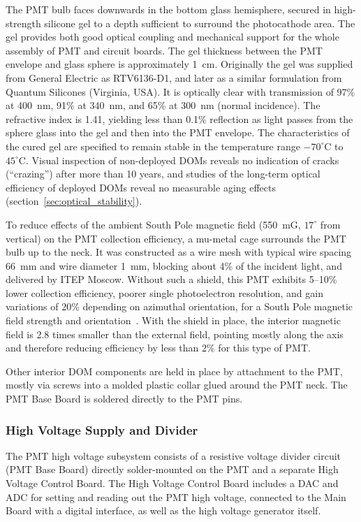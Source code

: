 The PMT bulb faces downwards in the bottom glass hemisphere, secured in high-strength 
silicone gel to a depth sufficient to surround the photocathode area.  
The gel provides both good optical coupling and mechanical support for the
whole assembly of PMT and circuit boards. The gel thickness between the PMT
envelope and glass sphere is approximately \qty{1}{cm}.   
Originally the gel was supplied from General Electric as RTV6136-D1,
and later as a similar formulation from Quantum Silicones (Virginia, USA).  
It is optically clear with transmission of 97\% at \qty{400}{nm}, 91\% at \qty{340}{nm}, and 65\% at \qty{300}{nm}
(normal incidence).  The refractive index is 1.41, yielding less than 0.1\% reflection as light
passes from the sphere glass into the gel and then into the PMT envelope.
The characteristics of the cured gel are specified to remain stable in the
temperature range $-70^\circ$C to $45^\circ$C.  Visual inspection of
non-deployed DOMs reveals no indication of cracks (``crazing'') after more than 10
years, and studies of the long-term optical efficiency of deployed DOMs
reveal no measurable aging effects (section~\ref{sec:optical_stability}).  

To reduce effects of the ambient South Pole magnetic field (\qty{550}{mG}, $17^\circ$
from vertical) on the PMT collection efficiency, a mu-metal cage surrounds the PMT bulb up to
the neck.  It was constructed as a wire mesh with typical wire spacing \qty{66}{mm} and
wire diameter \qty{1}{mm}, blocking about 4\% of the incident light,
and delivered by ITEP Moscow.
Without such a shield, this PMT exhibits 5--10\% lower
collection efficiency, poorer single photoelectron resolution, and gain variations of 20\% depending on 
azimuthal orientation, for a South Pole magnetic field strength and orientation~\cite{calvo}.
With the shield in place, the interior magnetic field is 2.8 times
smaller than the external field, pointing mostly along the axis and therefore reducing efficiency by
less than 2\% for this type of PMT.

Other interior DOM components are held in place by attachment to the PMT, mostly via screws into
a molded plastic collar glued around the PMT neck.  The PMT Base Board is
soldered directly to the PMT pins.

\subsubsection{\label{sec:hv}High Voltage Supply and Divider}

The PMT high voltage subsystem consists of a resistive 
voltage divider circuit (PMT Base Board) directly
solder-mounted on the PMT and a separate High Voltage Control Board. 
The High Voltage Control Board includes a DAC and ADC for setting and reading out the PMT high voltage,
connected to the Main Board with a digital interface, as well as the high
voltage generator itself.


